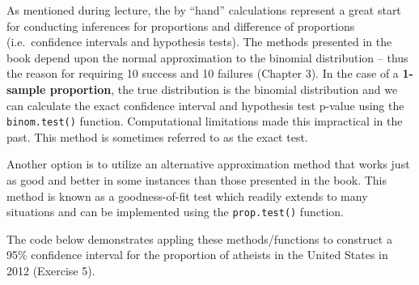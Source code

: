 \documentclass[]{book}
\newenvironment{Shaded}{\begin{snugshade}}{\end{snugshade}}
\newcommand{\CommentTok}[1]{\textcolor[rgb]{0.56,0.35,0.01}{\textit{#1}}}
\newcommand{\DataTypeTok}[1]{\textcolor[rgb]{0.13,0.29,0.53}{#1}}
\newcommand{\KeywordTok}[1]{\textcolor[rgb]{0.13,0.29,0.53}{\textbf{#1}}}
\newcommand{\NormalTok}[1]{#1}
\newcommand{\OperatorTok}[1]{\textcolor[rgb]{0.81,0.36,0.00}{\textbf{#1}}}
\newcommand{\StringTok}[1]{\textcolor[rgb]{0.31,0.60,0.02}{#1}}
\theoremstyle{definition}
\theoremstyle{definition}
\theoremstyle{definition}
\theoremstyle{remark}
\begin{document}
As mentioned during lecture, the by ``hand'' calculations represent a
great start for conducting inferences for proportions and difference of
proportions (i.e.~confidence intervals and hypothesis tests). The
methods presented in the book depend upon the normal approximation to
the binomial distribution -- thus the reason for requiring 10 success
and 10 failures (Chapter 3). In the case of a \textbf{1-sample
proportion}, the true distribution is the binomial distribution and we
can calculate the exact confidence interval and hypothesis test p-value
using the \texttt{binom.test()} function. Computational limitations made
this impractical in the past. This method is sometimes referred to as
the exact test.

Another option is to utilize an alternative approximation method that
works just as good and better in some instances than those presented in
the book. This method is known as a goodness-of-fit test which readily
extends to many situations and can be implemented using the
\texttt{prop.test()} function.

The code below demonstrates appling these methods/functions to construct
a 95\% confidence interval for the proportion of atheists in the United
States in 2012 (Exercise 5).

\begin{Shaded}
\end{Shaded}
\end{document}
